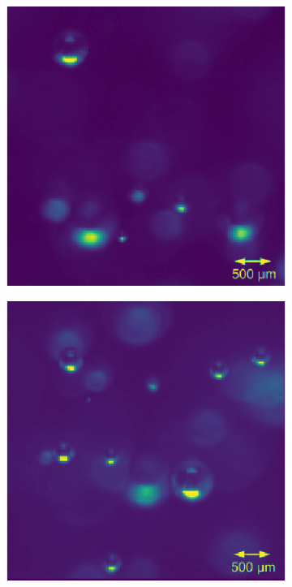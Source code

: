 		\begin{figure}[h]			
			\begin{subfigure}[t]{.4\textwidth}
				\centering
				\includegraphics[scale=0.45]{images/aq_result_low_small_1.png}
				\caption{}
				\label{subfig:low_a}
			\end{subfigure}\hfill
			\begin{subfigure}[t]{.4\textwidth}
				\centering
				\includegraphics[scale=0.45]{images/aq_result_low_small_2.png}				
				\caption{}
				\label{subfig:low_b}				
			\end{subfigure}
			

\end{figure}
